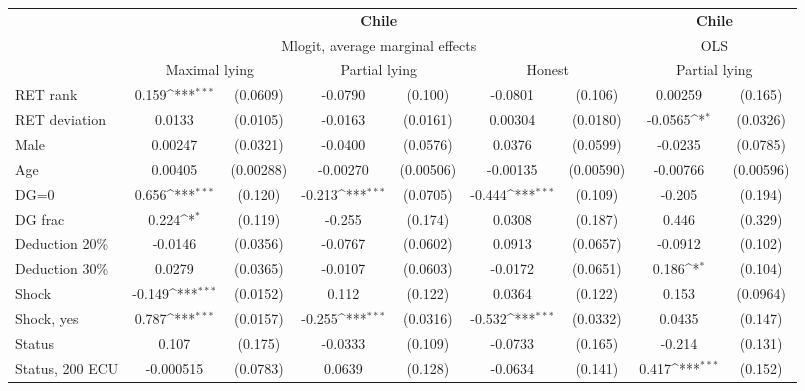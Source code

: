 \def\sym#1{\ifmmode^{#1}\else\(^{#1}\)\fi}
\begin{tabular}{l|cccccc|cc}
\hline\hline
&\multicolumn{6}{c|}{\bf Chile}&\multicolumn{2}{c}{\bf Chile}\\ &\multicolumn{6}{c|}{Mlogit, average marginal effects }&\multicolumn{2}{c}{OLS}\\
                &\multicolumn{2}{c}{Maximal lying}&\multicolumn{2}{c}{Partial lying}&\multicolumn{2}{c|}{Honest}  &\multicolumn{2}{c}{Partial lying}\\
\hline
RET rank        &    0.159\sym{***}& (0.0609)&  -0.0790         &  (0.100)&  -0.0801         &  (0.106)&  0.00259         &  (0.165)\\
RET deviation   &   0.0133         & (0.0105)&  -0.0163         & (0.0161)&  0.00304         & (0.0180)&  -0.0565\sym{*}  & (0.0326)\\
Male            &  0.00247         & (0.0321)&  -0.0400         & (0.0576)&   0.0376         & (0.0599)&  -0.0235         & (0.0785)\\
Age             &  0.00405         &(0.00288)& -0.00270         &(0.00506)& -0.00135         &(0.00590)& -0.00766         &(0.00596)\\
DG=0          &    0.656\sym{***}&  (0.120)&   -0.213\sym{***}& (0.0705)&   -0.444\sym{***}&  (0.109)&   -0.205         &  (0.194)\\
DG frac         &    0.224\sym{*}  &  (0.119)&   -0.255         &  (0.174)&   0.0308         &  (0.187)&    0.446         &  (0.329)\\
Deduction 20\%&  -0.0146         & (0.0356)&  -0.0767         & (0.0602)&   0.0913         & (0.0657)&  -0.0912         &  (0.102)\\
Deduction 30\%&   0.0279         & (0.0365)&  -0.0107         & (0.0603)&  -0.0172         & (0.0651)&    0.186\sym{*}  &  (0.104)\\
Shock         &   -0.149\sym{***}& (0.0152)&    0.112         &  (0.122)&   0.0364         &  (0.122)&    0.153         & (0.0964)\\
Shock, yes    &    0.787\sym{***}& (0.0157)&   -0.255\sym{***}& (0.0316)&   -0.532\sym{***}& (0.0332)&   0.0435         &  (0.147)\\
Status        &    0.107         &  (0.175)&  -0.0333         &  (0.109)&  -0.0733         &  (0.165)&   -0.214         &  (0.131)\\
Status, 200 ECU&-0.000515         & (0.0783)&   0.0639         &  (0.128)&  -0.0634         &  (0.141)&    0.417\sym{***}&  (0.152)\\

\end{tabular}
